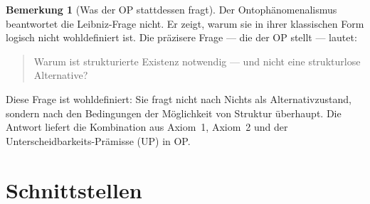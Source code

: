 \documentclass[11pt,a4paper]{article}
\theoremstyle{plain}
\theoremstyle{definition}
\newtheorem{remark}{Bemerkung}[section]
\begin{document}
\begin{remark}[Was der OP stattdessen fragt]
Der Ontoph\"{a}nomenalismus beantwortet die Leibniz-Frage nicht. Er zeigt, warum sie
in ihrer klassischen Form logisch nicht wohldefiniert ist. Die pr\"{a}zisere Frage ---
die der OP stellt --- lautet:
\begin{quote}
\glqq{}Warum ist strukturierte Existenz notwendig --- und nicht eine
strukturlose Alternative?\grqq{}
\end{quote}
Diese Frage ist wohldefiniert: Sie fragt nicht nach \glqq{}Nichts\grqq{} als
Alternativzustand, sondern nach den Bedingungen der M\"{o}glichkeit von Struktur
\"{u}berhaupt. Die Antwort liefert die Kombination aus Axiom~1, Axiom~2 und der
Unterscheidbarkeits-Pr\"{a}misse (UP) in OP.
\end{remark}

\section{Schnittstellen}
\end{document}
